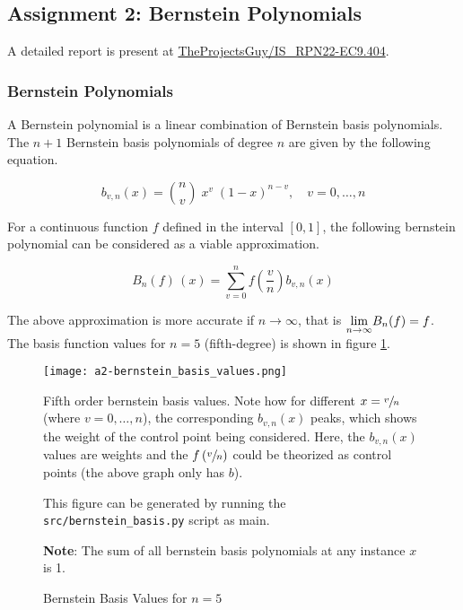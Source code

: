 
\subsection{Assignment 2: Bernstein Polynomials}

A detailed report is present at \href{https://github.com/TheProjectsGuy/IS_RPN22-EC9.404/tree/main/assignment-two-TheProjectsGuy}{TheProjectsGuy/IS\_RPN22-EC9.404}.

\subsubsection{Bernstein Polynomials}

A Bernstein polynomial is a linear combination of Bernstein basis polynomials. The $n+1$ Bernstein basis polynomials of degree $n$ are given by the following equation.

\begin{equation}
    b_{v,n}(x) = \binom{n}{v} \; x^v \; (1-x)^{n-v}, \quad v = 0,\dots,n
    \label{eq:bernstein-basis-term}
\end{equation}

For a continuous function $f$ defined in the interval $[0, 1]$, the following bernstein polynomial can be considered as a viable approximation.

\begin{equation}
    B_{n}(f)\,(x) = \sum_{v=0}^{n} f \left ( \frac{v}{n} \right ) b_{v, n} (x)
    \label{eq:bernstein-approx-func}
\end{equation}

The above approximation is more accurate if $n\rightarrow \infty$, that is $\underset{n \rightarrow \infty}{\textup{lim}} B_n(f) = f$.
The basis function values for $n=5$ (fifth-degree) is shown in figure \ref{fig:bernstein-basis-plots}.

\begin{figure}[ht]
    \centering
    \texttt{[image: a2-bernstein\_basis\_values.png]}
    \caption{Bernstein Basis Values for $n=5$}
    \label{fig:bernstein-basis-plots}
    \small
        Fifth order bernstein basis values. Note how for different $x = \sfrac{v}{n}$ (where $v = 0,\dots,n$), the corresponding $b_{v,n}(x)$ peaks, which shows the weight of the control point being considered. Here, the $b_{v,n}(x)$ values are weights and the $f\left(\sfrac{v}{n}\right)$ could be theorized as control points (the above graph only has $b$).

        This figure can be generated by running the \texttt{src/bernstein\_basis.py} script as main.

        \textbf{Note}: The sum of all bernstein basis polynomials at any instance $x$ is 1.
\end{figure}

